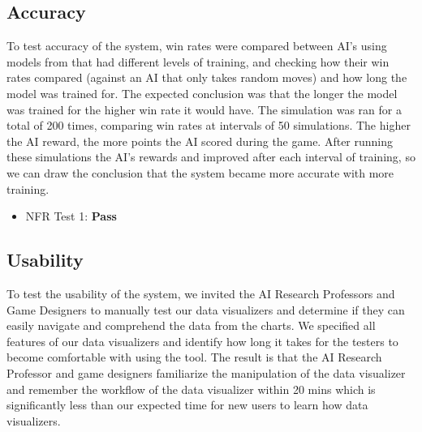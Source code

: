 \documentclass[12pt, titlepage]{article}
\begin{document}
\subsection{Accuracy}
To test accuracy of the system, win rates were compared between AI's using models from that had different levels of training, and checking how their win rates compared (against an AI that only takes random moves) and how long the model was trained for. The expected conclusion was that the longer the model was trained for the higher win rate it would have. The simulation was ran for a total of 200 times, comparing win rates at intervals of 50 simulations. The higher the AI reward, the more points the AI scored during the game. After running these simulations the AI's rewards and improved after each interval of training, so we can draw the conclusion that the system became more accurate with more training.
\begin{itemize}
    \item NFR Test 1: \textbf{Pass}
\end{itemize}
\begin{center}
\end{center}


\subsection{Usability}
To test the usability of the system, we invited the AI Research Professors and Game Designers to manually test our data visualizers and determine if they can easily navigate and comprehend the data from the charts. We specified all features of our data visualizers and identify how long it takes for the testers to become comfortable with using the tool. The result is that the AI Research Professor and game designers familiarize the manipulation of the data visualizer and remember the workflow of the data visualizer within 20 mins which is significantly less than our expected time for new users to learn how data visualizers. 
\end{document}
